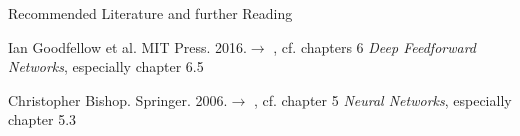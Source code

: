 \begin{frame}{Recommended Literature and further Reading}{}
	\footnotesize
	\begin{thebibliography}{2}
			{Ian Goodfellow et al. MIT Press. 2016.}{$\rightarrow$ \href{
				http://www.deeplearningbook.org/
			}{}, cf. chapters 6 \textit{Deep Feedforward Networks}, especially chapter 6.5}
	
			{Christopher Bishop. Springer. 2006.}{$\rightarrow$ \href{
				http://users.isr.ist.utl.pt/~wurmd/Livros/school/Bishop\%20-\%20Pattern\%20Recognition\%20And\%20Machine\%20Learning\%20-\%20Springer\%20\%202006.pdf
			}{}, cf. chapter 5 \textit{Neural Networks}, especially chapter 5.3}

	\end{thebibliography}
\end{frame}


\makethanks

